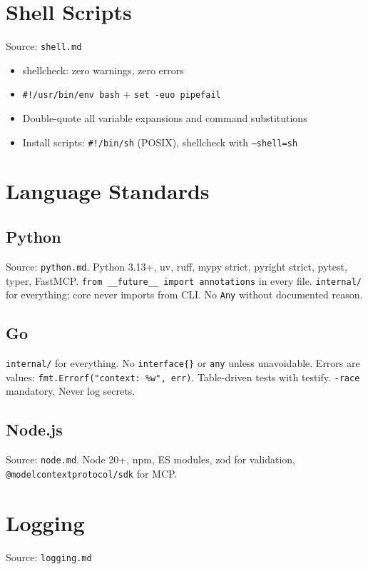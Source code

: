 \documentclass[a4paper,10pt]{article}
\begin{document}
\section{Shell Scripts}
\label{sec:shell}
Source: \texttt{shell.md}

\begin{itemize}
  \item shellcheck: zero warnings, zero errors
  \item \texttt{\#!/usr/bin/env bash} + \texttt{set -euo pipefail}
  \item Double-quote all variable expansions and command substitutions
  \item Install scripts: \texttt{\#!/bin/sh} (POSIX), shellcheck with \texttt{--shell=sh}
\end{itemize}

\section{Language Standards}
\label{sec:lang}

\subsection{Python}
Source: \texttt{python.md}.
Python 3.13+, uv, ruff, mypy strict, pyright strict, pytest, typer, FastMCP.
\texttt{from \_\_future\_\_ import annotations} in every file.
\texttt{internal/} for everything; core never imports from CLI.
No \texttt{Any} without documented reason.

\subsection{Go}
\texttt{internal/} for everything.
No \texttt{interface\{\}} or \texttt{any} unless unavoidable.
Errors are values: \texttt{fmt.Errorf("context: \%w", err)}.
Table-driven tests with testify. \texttt{-race} mandatory. Never log secrets.

\subsection{Node.js}
Source: \texttt{node.md}.
Node 20+, npm, ES modules, zod for validation,
\texttt{@modelcontextprotocol/sdk} for MCP.

\section{Logging}
\label{sec:logging}
Source: \texttt{logging.md}
\end{document}
